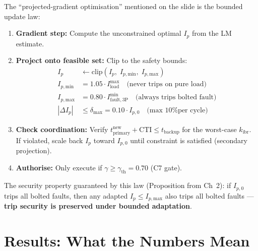 \documentclass[12pt,a4paper]{article}
\newcommand{\kibr}{k_\mathrm{ibr}}
\newcommand{\Ip}{I_p}
\newcommand{\tpri}{t_\mathrm{primary}}
\newcommand{\tbak}{t_\mathrm{backup}}
\newcommand{\CTI}{\mathrm{CTI}}
\begin{document}
The ``projected-gradient optimisation'' mentioned on the slide is the bounded update law:

\begin{enumerate}[nosep]
  \item \textbf{Gradient step:} Compute the unconstrained optimal $\Ip$ from the LM estimate.
  \item \textbf{Project onto feasible set:} Clip to the safety bounds:
    \begin{align}
      \Ip &\leftarrow \mathrm{clip}\!\left(\Ip,\; I_{p,\mathrm{min}},\; I_{p,\mathrm{max}}\right) \\
      I_{p,\mathrm{min}} &= 1.05 \cdot I_\mathrm{load}^\mathrm{max} \quad \text{(never trips on pure load)} \\
      I_{p,\mathrm{max}} &= 0.80 \cdot I_\mathrm{fault,3P}^\mathrm{min} \quad \text{(always trips bolted fault)} \\
      |\Delta \Ip| &\leq \delta_\mathrm{max} = 0.10 \cdot I_{p,0} \quad \text{(max 10\% per cycle)}
    \end{align}
  \item \textbf{Check coordination:} Verify $\tpri^\mathrm{new} + \CTI \leq \tbak$ for the worst-case $\kibr$.
        If violated, scale back $\Ip$ toward $I_{p,0}$ until constraint is satisfied (secondary projection).
  \item \textbf{Authorise:} Only execute if $\gamma \geq \gamma_\mathrm{th} = 0.70$ (C7 gate).
\end{enumerate}

The security property guaranteed by this law (Proposition from Ch~2): if $I_{p,0}$ trips all bolted faults, then any adapted $\Ip \leq I_{p,\mathrm{max}}$ also trips all bolted faults --- \textbf{trip security is preserved under bounded adaptation}.

\section{Results: What the Numbers Mean}
\end{document}
